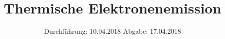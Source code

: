 
\usepackage{wrapfig}
\subject{VERSUCH 504}
\title{Thermische Elektronenemission}
\date{%
  \hspace{-2.5em}
  Durchführung: 10.04.2018
  \hspace{4em}
  Abgabe: 17.04.2018
}


  \setlength{\parindent}{0em}
  \maketitle
  \thispagestyle{empty}
  \newpage
  \tableofcontents
  \newpage





\printbibliography{}



